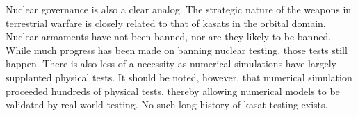 Nuclear governance is also a clear analog.  The strategic nature of
the weapons in terrestrial warfare is closely related to that of
\acp{kasat} in the orbital domain.  Nuclear armaments have not been
banned, nor are they likely to be banned.  While much progress has
been made on banning nuclear testing, those tests still happen.  There
is also less of a necessity as numerical simulations have largely
supplanted physical tests.  It should be noted, however, that
numerical simulation proceeded hundreds of physical tests, thereby
allowing numerical models to be validated by real-world testing.  No
such long history of \ac{kasat} testing exists.
